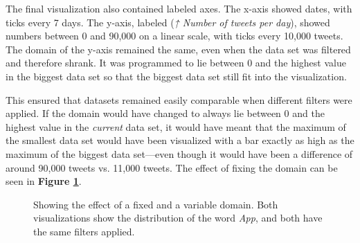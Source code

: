 The final visualization also contained labeled axes. The x-axis showed dates, with ticks every 7 days. The y-axis, labeled  (\emph{↑ Number of tweets per day}), showed numbers between 0 and 90,000 on a linear scale, with ticks every 10,000 tweets. The domain of the y-axis remained the same, even when the data set was filtered and therefore shrank. It was programmed to lie between 0 and the highest value in the biggest data set so that the biggest data set still fit into the visualization.

This ensured that datasets remained easily comparable when different filters were applied. If the domain would have changed to always lie between 0 and the highest value in the \emph{current} data set, it would have meant that the maximum of the smallest data set would have been visualized with a bar exactly as high as the maximum of the biggest data set---even though it would have been a difference of around 90,000 tweets vs. 11,000 tweets. The effect of fixing the domain can be seen in \textbf{Figure \ref{fig:variableVsFixedDomain}}.

\begin{figure}[h!tb]
    \caption{Showing the effect of a fixed and a variable domain. Both visualizations show the distribution of the word \emph{App}, and both have the same filters applied.}
    \label{fig:variableVsFixedDomain}
\end{figure}

